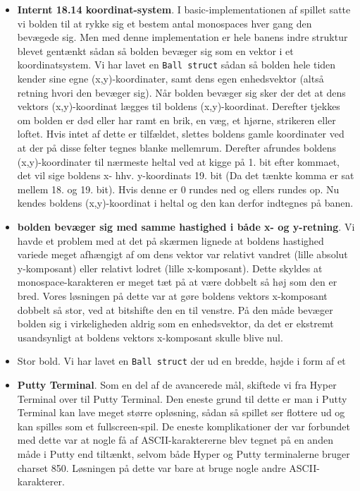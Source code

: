 \begin{itemize}
\item \textbf{Internt 18.14 koordinat-system}. I basic-implementationen af spillet satte vi bolden til at rykke sig et bestem antal monospaces hver gang den bevægede sig. Men med denne implementation er hele banens indre struktur blevet gentænkt sådan så bolden bevæger sig som en vektor i et koordinatsystem. Vi har lavet en \texttt{Ball struct} sådan så bolden hele tiden kender sine egne (x,y)-koordinater, samt dens egen enhedsvektor (altså retning hvori den bevæger sig). Når bolden bevæger sig sker der det at dens vektors (x,y)-koordinat lægges til boldens (x,y)-koordinat. Derefter tjekkes om bolden er død eller har ramt en brik, en væg, et hjørne, strikeren eller loftet. Hvis intet af dette er tilfældet, slettes boldens gamle koordinater ved at der på disse felter tegnes blanke mellemrum. Derefter afrundes boldens (x,y)-koordinater til nærmeste heltal ved at kigge på 1. bit efter kommaet, det vil sige boldens x- hhv. y-koordinats 19. bit (Da det tænkte komma er sat mellem 18. og 19. bit). Hvis denne er 0 rundes ned og ellers rundes op. Nu kendes boldens (x,y)-koordinat i heltal og den kan derfor indtegnes på banen.\\


\item \textbf{bolden bevæger sig med samme hastighed i både x- og y-retning}. Vi havde et problem med at det på skærmen lignede at boldens hastighed variede meget afhængigt af om dens vektor var relativt vandret (lille absolut y-komposant) eller relativt lodret (lille x-komposant). Dette skyldes at monospace-karakteren er meget tæt på at være dobbelt så høj som den er bred. Vores løsningen på dette var at gøre boldens vektors x-komposant dobbelt så stor, ved at bitshifte den en til venstre. På den måde bevæger bolden sig i virkeligheden aldrig som en enhedsvektor, da det er ekstremt usandsynligt at boldens vektors x-komposant skulle blive nul.

\item Stor bold. Vi har lavet en \texttt{Ball struct} der ud en bredde, højde i form af et

\item \textbf{Putty Terminal}. Som en del af de avancerede mål, skiftede vi fra Hyper Terminal over til Putty Terminal. Den eneste grund til dette er man i Putty Terminal kan lave meget større opløsning, sådan så spillet ser flottere ud og kan spilles som et fullscreen-spil. De eneste komplikationer der var forbundet med dette var at nogle få af ASCII-karaktererne blev tegnet på en anden måde i Putty end tiltænkt, selvom både Hyper og Putty terminalerne bruger charset 850. Løsningen på dette var bare at bruge nogle andre ASCII-karakterer.
\end{itemize}



